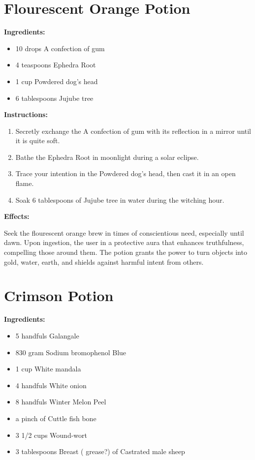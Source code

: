 \documentclass{article}
\begin{document}
\newpage
\section*{Flourescent Orange Potion}

\textbf{Ingredients:}

\begin{itemize}
  \item 10 drops A confection of gum
  \item 4 teaspoons Ephedra Root
  \item 1 cup Powdered dog's head
  \item 6 tablespoons Jujube tree
\end{itemize}

\textbf{Instructions:}

\begin{enumerate}
  \item Secretly exchange the A confection of gum with its reflection in a mirror until it is quite soft.
  \item Bathe the Ephedra Root in moonlight during a solar eclipse.
  \item Trace your intention in the Powdered dog's head, then cast it in an open flame.
  \item Soak 6 tablespoons of Jujube tree in water during the witching hour.
\end{enumerate}

\textbf{Effects:}

Seek the flourescent orange brew in times of conscientious need, especially until dawn. Upon ingestion, the user in a protective aura that enhances truthfulness, compelling those around them. The potion grants the power to turn objects into gold, water, earth, and shields against harmful intent from others.

\newpage
\section*{Crimson Potion}

\textbf{Ingredients:}

\begin{itemize}
  \item 5 handfuls Galangale
  \item 830 gram Sodium bromophenol Blue
  \item 1 cup White mandala
  \item 4 handfuls White onion
  \item 8 handfuls Winter Melon Peel
  \item a pinch of Cuttle fish bone
  \item 3 1/2 cups Wound-wort
  \item 3 tablespoons Breast ( grease?) of Castrated male sheep
\end{itemize}
\end{document}
